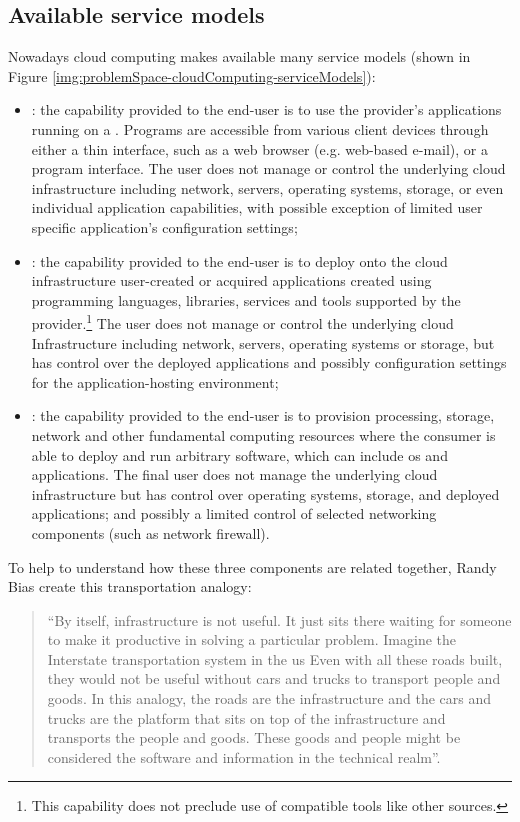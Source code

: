 \subsection*{Available service models}
\label{sec:problemSpace-cloudComputing-cloudServiceModels}
Nowadays cloud computing makes available many service models (shown in Figure
\ref{img:problemSpace-cloudComputing-serviceModels}):

\begin{itemize}
	\item{: the capability provided to the end-user is to use the provider's
		applications running on a . Programs are accessible from various
		client devices through either a thin interface, such as a web browser (e.g. web-based e-mail),
		or a program interface. The user does not manage or control the underlying cloud infrastructure
		including network, servers, operating systems, storage, or even individual application capabilities,
		with possible exception of limited user specific application's configuration settings;}
	\item{: the capability provided to the end-user is to deploy onto the cloud
		infrastructure user-created or acquired applications created using programming languages,
		libraries, services and tools supported by the provider.\footnote{This capability does not preclude
		use of compatible tools like other sources.} The user does not manage or control the underlying
		cloud Infrastructure including network, servers, operating systems or storage, but has control
		over the deployed applications and possibly configuration settings for the application-hosting
		environment;}
	\item{: the capability provided to the end-user is to provision processing, storage,
		network and other fundamental computing resources where the consumer is able to deploy and run
		arbitrary software, which can include \acs{os} and applications. The final user does not
		manage the underlying cloud infrastructure but has control over operating systems, storage, and
		deployed applications; and possibly a limited control of selected networking components (such as
		network firewall).}
\end{itemize}

To help to understand how these three components are related together, Randy Bias \cite{differenceIaasPaas}
create this transportation analogy:

\begin{quote}
	``By itself, infrastructure is not useful. It just sits there waiting for someone to make it productive in
	solving a particular problem. Imagine the Interstate transportation system in the \acs{us} Even with all
	these roads built, they would not be useful without cars and trucks to transport people and goods. In this
	analogy, the roads are the infrastructure and the cars and trucks are the platform that sits on top of the
	infrastructure and transports the people and goods. These goods and people might be considered the software
	and information in the technical realm''.
\end{quote}

